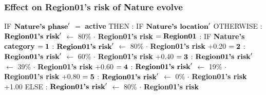 \documentclass{article}%
\begin{document}
%
\subsubsection{Effect on Region01's risk of Nature evolve}%
\label{ssubsec:Effect on Region01's risk of Nature evolve}%
\begin{flushleft}%
IF %
$\mbox{\textbf{Nature's phase}} '$%
$=$%
\textbf{active}%
\linebreak%
\hspace*{2em}%
THEN %
: %
IF %
$\mbox{\textbf{Nature's location}} '$%
\linebreak%
\hspace*{4em}%
OTHERWISE %
: %
$\mbox{\textbf{Region01's risk}} '$%
$\leftarrow$%
80\%%
$\cdot$%
\textbf{Region01's risk}%
\linebreak%
\hspace*{4em}%
$= \mbox{\textbf{Region01}}$%
: %
IF %
\textbf{Nature's category}%
\linebreak%
\hspace*{6em}%
$= \mbox{\textbf{1}}$%
: %
$\mbox{\textbf{Region01's risk}} '$%
$\leftarrow$%
80\%%
$\cdot$%
\textbf{Region01's risk}%
+0.20%
\linebreak%
\hspace*{6em}%
$= \mbox{\textbf{2}}$%
: %
$\mbox{\textbf{Region01's risk}} '$%
$\leftarrow$%
60\%%
$\cdot$%
\textbf{Region01's risk}%
+0.40%
\linebreak%
\hspace*{6em}%
$= \mbox{\textbf{3}}$%
: %
$\mbox{\textbf{Region01's risk}} '$%
$\leftarrow$%
39\%%
$\cdot$%
\textbf{Region01's risk}%
+0.60%
\linebreak%
\hspace*{6em}%
$= \mbox{\textbf{4}}$%
: %
$\mbox{\textbf{Region01's risk}} '$%
$\leftarrow$%
19\%%
$\cdot$%
\textbf{Region01's risk}%
+0.80%
\linebreak%
\hspace*{6em}%
$= \mbox{\textbf{5}}$%
: %
$\mbox{\textbf{Region01's risk}} '$%
$\leftarrow$%
0\%%
$\cdot$%
\textbf{Region01's risk}%
+1.00%
\linebreak%
\hspace*{2em}%
ELSE %
: %
$\mbox{\textbf{Region01's risk}} '$%
$\leftarrow$%
80\%%
$\cdot$%
\textbf{Region01's risk}%
\end{flushleft}

%
\end{document}
